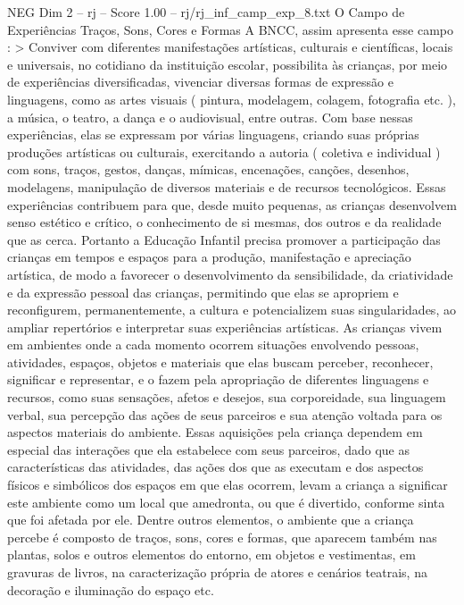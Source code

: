 \begin{textsample}{NEG Dim 2 – rj – Score 1.00 – rj/rj\_inf\_camp\_exp\_8.txt}  \label{ex:f2_neg_057}
O Campo de Experiências Traços, Sons, Cores e Formas A BNCC, assim apresenta esse campo : > Conviver com diferentes manifestações artísticas, culturais e científicas, locais e universais, no cotidiano da instituição escolar, possibilita às crianças, por meio de experiências diversificadas, vivenciar diversas formas de expressão e linguagens, como as artes visuais ( pintura, modelagem, colagem, fotografia etc. ), a música, o teatro, a dança e o audiovisual, entre outras.
Com base nessas experiências, elas se expressam por várias linguagens, criando suas próprias produções artísticas ou culturais, exercitando a autoria ( coletiva e individual ) com sons, traços, gestos, danças, mímicas, encenações, canções, desenhos, modelagens, manipulação de diversos materiais e de recursos tecnológicos.
Essas experiências contribuem para que, desde muito pequenas, as crianças desenvolvem senso estético e crítico, o conhecimento de si mesmas, dos outros e da realidade que as cerca.
Portanto a Educação Infantil precisa promover a participação das crianças em tempos e espaços para a produção, manifestação e apreciação artística, de modo a favorecer o desenvolvimento da sensibilidade, da criatividade e da expressão pessoal das crianças, permitindo que elas se apropriem e reconfigurem, permanentemente, a cultura e potencializem suas singularidades, ao ampliar repertórios e interpretar suas experiências artísticas.
As crianças vivem em ambientes onde a cada momento ocorrem situações envolvendo pessoas, atividades, espaços, objetos e materiais que elas buscam perceber, reconhecer, significar e representar, e o fazem pela apropriação de diferentes linguagens e recursos, como suas sensações, afetos e desejos, sua corporeidade, sua linguagem verbal, sua percepção das ações de seus parceiros e sua atenção voltada para os aspectos materiais do ambiente.
Essas aquisições pela criança dependem em especial das interações que ela estabelece com seus parceiros, dado que as características das atividades, das ações dos que as executam e dos aspectos físicos e simbólicos dos espaços em que elas ocorrem, levam a criança a significar este ambiente como um local que amedronta, ou que é divertido, conforme sinta que foi afetada por ele.
Dentre outros elementos, o ambiente que a criança percebe é composto de traços, sons, cores e formas, que aparecem também nas plantas, solos e outros elementos do entorno, em objetos e vestimentas, em gravuras de livros, na caracterização própria de atores e cenários teatrais, na decoração e iluminação do espaço etc.

\end{textsample}
